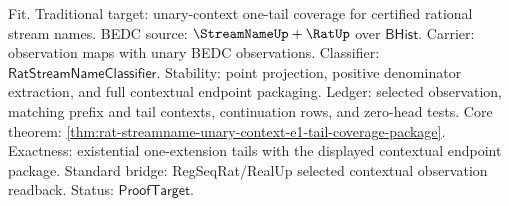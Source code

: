 Fit. Traditional target: unary-context one-tail coverage for certified rational
stream names. BEDC source: $\StreamNameUp+\RatUp$ over $\mathsf{BHist}$.
Carrier: observation maps with unary BEDC observations. Classifier:
$\mathsf{RatStreamNameClassifier}$. Stability: point projection, positive
denominator extraction, and full contextual endpoint packaging. Ledger: selected
observation, matching prefix and tail contexts, continuation rows, and zero-head
tests. Core theorem:
\autoref{thm:rat-streamname-unary-context-e1-tail-coverage-package}. Exactness:
existential one-extension tails with the displayed contextual endpoint package.
Standard bridge: RegSeqRat/RealUp selected contextual observation readback.
Status: $\mathsf{ProofTarget}$.
